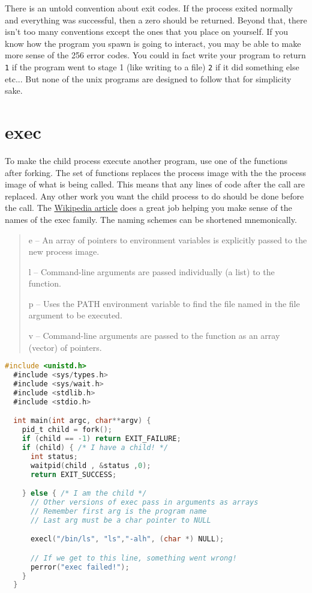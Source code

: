 There is an untold convention about exit codes. If the process exited normally and everything was successful, then a zero should be returned. Beyond that, there isn't too many conventions except the ones that you place on yourself. If you know how the program you spawn is going to interact, you may be able to make more sense of the 256 error codes. You could in fact write your program to return \texttt{1} if the program went to stage 1 (like writing to a file) \texttt{2} if it did something else etc... But none of the unix programs are designed to follow that for simplicity sake.

\section{exec}

To make the child process execute another program, use one of the \href{http://man7.org/linux/man-pages/man3/exec.3.html}{} functions after forking. The  set of functions replaces the process image with the the process image of what is being called. This means that any lines of code after the  call are replaced. Any other work you want the child process to do should be done before the  call. The \href{https://en.wikipedia.org/wiki/Exec_(system_call)\#C_language_prototypes}{Wikipedia article} does a great job helping you make sense of the names of the exec family. The naming schemes can be shortened mnemonically.

\begin{quote}
  e -- An array of pointers to environment variables is explicitly passed to the new process image.

  l -- Command-line arguments are passed individually (a list) to the function.

  p -- Uses the PATH environment variable to find the file named in the file argument to be executed.

  v -- Command-line arguments are passed to the function as an array (vector) of pointers.
\end{quote}

\begin{lstlisting}[language=C]
  #include <unistd.h>
  #include <sys/types.h> 
  #include <sys/wait.h>
  #include <stdlib.h>
  #include <stdio.h>

  int main(int argc, char**argv) {
    pid_t child = fork();
    if (child == -1) return EXIT_FAILURE;
    if (child) { /* I have a child! */
      int status;
      waitpid(child , &status ,0);
      return EXIT_SUCCESS;

    } else { /* I am the child */
      // Other versions of exec pass in arguments as arrays
      // Remember first arg is the program name
      // Last arg must be a char pointer to NULL

      execl("/bin/ls", "ls","-alh", (char *) NULL);

      // If we get to this line, something went wrong!
      perror("exec failed!");
    }
  }
\end{lstlisting}

